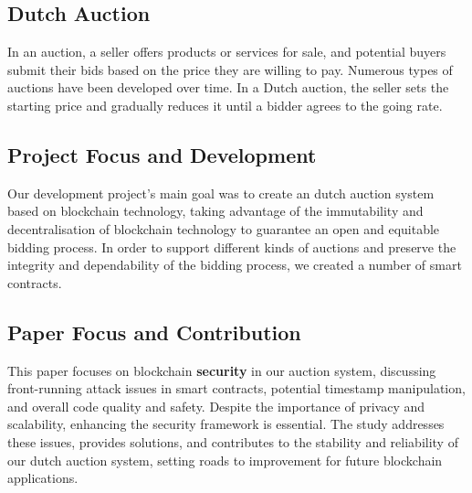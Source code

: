 \documentclass[conference]{IEEEtran}
\begin{document}
\subsection{Dutch Auction}
In an auction, a seller offers products or services for sale, and potential buyers submit their bids based on the price they are willing to pay. Numerous types of auctions have been developed over time. In a Dutch auction, the seller sets the starting price and gradually reduces it until a bidder agrees to the going rate\cite{bennettGoingGoingGone2020}.

\subsection{Project Focus and Development}

Our development project's main goal was to create an dutch auction system based on blockchain technology, taking advantage of the immutability and decentralisation of blockchain technology to guarantee an open and equitable bidding process. In order to support different kinds of auctions and preserve the integrity and dependability of the bidding process, we created a number of smart contracts.
 

\subsection{Paper Focus and Contribution}

This paper focuses on blockchain \textbf{security} in our auction system, discussing front-running attack issues in smart contracts, potential timestamp manipulation, and overall code quality and safety. Despite the importance of privacy and scalability, enhancing the security framework is essential. The study addresses these issues, provides solutions, and contributes to the stability and reliability of our dutch auction system, setting roads to improvement for future blockchain applications.


\end{document}
